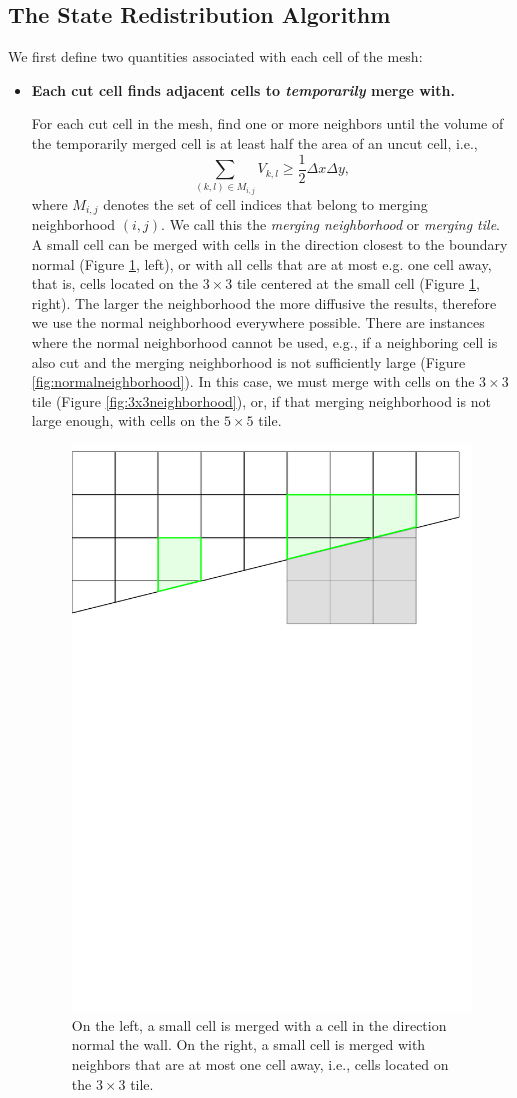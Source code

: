 \subsection{The State Redistribution Algorithm}

We first define two quantities associated with each cell of the mesh:

\begin{itemize}
\item
{\bf Each cut cell finds adjacent cells to {\em temporarily} merge with.}

\vspace*{.1in}
For each cut cell in the mesh, find  one or more neighbors until the
volume of the temporarily merged cell is at least half the area of an uncut cell, i.e., 
\begin{equation} \label{eq:vmerge}
\sum_{(k,l) \in M_{i,j}} V_{k,l} \geq \frac{1}{2}\Delta x\Delta y,
\end{equation}
where $M_{i,j}$ denotes the set of cell indices that belong to merging neighborhood $(i,j)$.
We call this the 
{\em  merging neighborhood} or {\em merging tile}.  
A small cell can be merged with cells in the direction closest to the boundary normal (Figure \ref{fig:neighborhoods}, left), or with all cells that are at most e.g. one cell away, that is, cells located on the $3 \times 3$ tile centered at the small cell (Figure \ref{fig:neighborhoods}, right).
The larger the neighborhood the more diffusive the results, therefore we use the normal neighborhood everywhere possible.
There are instances where the normal neighborhood cannot be used, e.g., if a neighboring cell is also cut and the
merging neighborhood is not sufficiently large (Figure \ref{fig:normalneighborhood}).  In this case, we must merge with cells on the $3\times3$ tile (Figure \ref{fig:3x3neighborhood}), or, if that merging neighborhood is not large enough, with cells on the $5 \times 5$ tile.

\begin{figure}
    \centering
    \includegraphics[width=0.5\linewidth]{figs/neighborhoods.pdf}
    \caption{On the left, a small cell is merged with a cell in the direction normal the wall.  On the right, a small cell is merged with neighbors that are at most one cell away, i.e., cells located on the $3\times3$ tile.}
    \label{fig:neighborhoods}
\end{figure}


\end{itemize}
